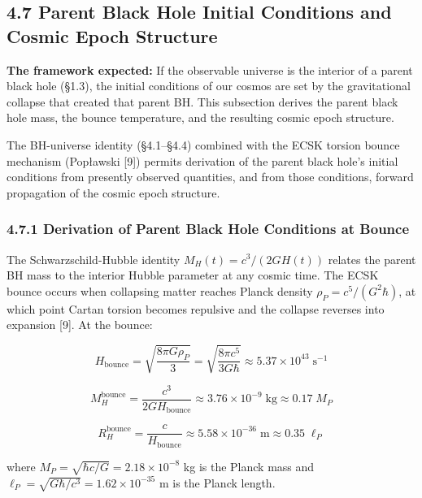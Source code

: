 \documentclass[11pt,a4paper]{article}
\theoremstyle{definition}\newtheorem{definition}{Definition}
\theoremstyle{remark}\newtheorem{remark}{Remark}
\begin{document}
\subsection{4.7 Parent Black Hole Initial Conditions and Cosmic Epoch Structure}


\textbf{The framework expected:} If the observable universe is the interior of a parent black hole (§1.3), the initial conditions of our cosmos are set by the gravitational collapse that created that parent BH. This subsection derives the parent black hole mass, the bounce temperature, and the resulting cosmic epoch structure.

The BH-universe identity (§4.1–§4.4) combined with the ECSK torsion bounce mechanism (Popławski [9]) permits derivation of the parent black hole's initial conditions from presently observed quantities, and from those conditions, forward propagation of the cosmic epoch structure.
\subsubsection{4.7.1 Derivation of Parent Black Hole Conditions at Bounce}

The Schwarzschild-Hubble identity $M_H(t) = c^3/(2GH(t))$ relates the parent BH mass to the interior Hubble parameter at any cosmic time. The ECSK bounce occurs when collapsing matter reaches Planck density $\rho_P = c^5/(G^2\hbar)$, at which point Cartan torsion becomes repulsive and the collapse reverses into expansion [9]. At the bounce:


\begin{equation}
H_{\text{bounce}} = \sqrt{\frac{8\pi G \rho_P}{3}} = \sqrt{\frac{8\pi c^5}{3G\hbar}} \approx 5.37 \times 10^{43} \; \text{s}^{-1}
\end{equation}



\begin{equation}
M_H^{\text{bounce}} = \frac{c^3}{2G H_{\text{bounce}}} \approx 3.76 \times 10^{-9} \; \text{kg} \approx 0.17 \; M_P
\end{equation}



\begin{equation}
R_H^{\text{bounce}} = \frac{c}{H_{\text{bounce}}} \approx 5.58 \times 10^{-36} \; \text{m} \approx 0.35 \; \ell_P
\end{equation}


where $M_P = \sqrt{\hbar c/G} = 2.18 \times 10^{-8}$ kg is the Planck mass and $\ell_P = \sqrt{G\hbar/c^3} = 1.62 \times 10^{-35}$ m is the Planck length.
\end{document}
